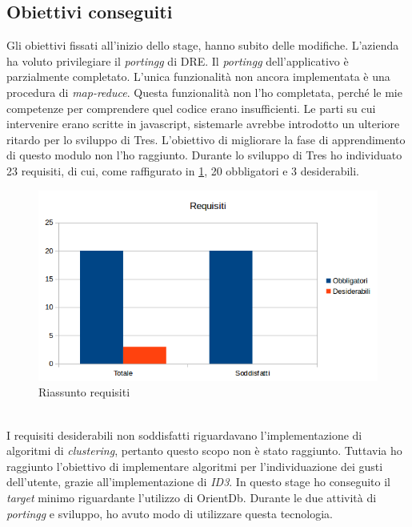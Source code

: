 \subsection{Obiettivi conseguiti}
Gli obiettivi fissati all'inizio dello stage, hanno subito delle modifiche. L'azienda ha voluto privilegiare il \emph{\gls{portingg}} di DRE. Il \emph{\gls{portingg}} dell'applicativo è parzialmente completato. L'unica funzionalità non ancora implementata è una procedura di \emph{map-reduce}. Questa funzionalità non l'ho completata, perché le mie competenze per comprendere quel codice erano insufficienti. Le parti su cui intervenire erano scritte in javascript, sistemarle avrebbe introdotto un ulteriore ritardo per lo sviluppo di Tres. L'obiettivo di migliorare la fase di apprendimento di questo modulo non l'ho raggiunto. Durante lo sviluppo di Tres ho individuato 23 requisiti, di cui, come raffigurato in \ref{fig:graficorequisiti}, 20 obbligatori e 3 desiderabili.  
\begin{figure}[h]
\centering
\includegraphics[scale=0.64]{immagini/graficorequisiti}
\caption{Riassunto requisiti}
\label{fig:graficorequisiti}
\end{figure}
\\I requisiti desiderabili non soddisfatti riguardavano l'implementazione di algoritmi di \emph{clustering}, pertanto questo scopo non è stato raggiunto.
Tuttavia ho raggiunto l'obiettivo di implementare algoritmi per l'individuazione dei gusti dell'utente, grazie all'implementazione di \emph{ID3}. In questo stage ho conseguito il \emph{target} minimo riguardante l'utilizzo di OrientDb. Durante le due attività di \emph{\gls{portingg}} e sviluppo, ho avuto modo di utilizzare questa tecnologia. 
